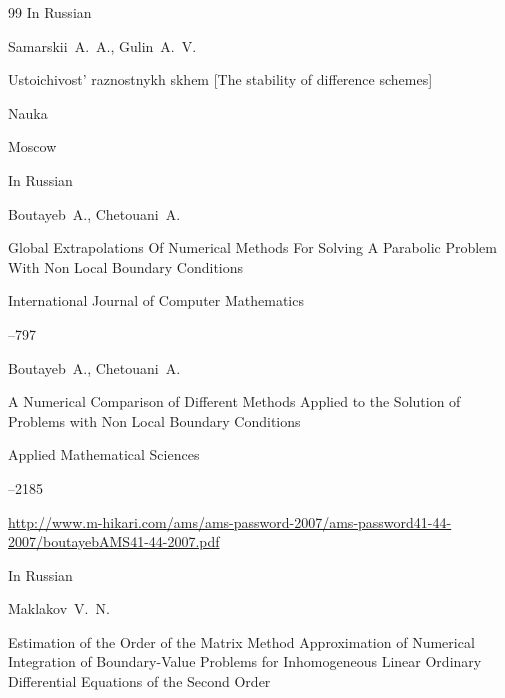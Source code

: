 \begin{thebibliography}{99}
\lang In Russian





\by Samarskii~A.~A., Gulin~A.~V.

\book Ustoichivost' raznostnykh skhem \rm [The stability of difference schemes]

\publ Nauka

\publaddr Moscow


\lang In Russian







\by Boutayeb~A., Chetouani~A.

\paper Global Extrapolations Of Numerical Methods For Solving A Parabolic Problem With Non Local Boundary Conditions

\jour International Journal of Computer Mathematics



--797






\by Boutayeb~A., Chetouani~A.

\paper A Numerical Comparison of Different Methods Applied to the Solution of Problems with Non Local Boundary Conditions

\jour Applied Mathematical Sciences




--2185

\elink \url{http://www.m-hikari.com/ams/ams-password-2007/ams-password41-44-2007/boutayebAMS41-44-2007.pdf}






\lang In Russian

\by Maklakov~V.~N.

\paper Estimation of the Order of the Matrix Method Approximation of Numerical Integration of Boundary-Value Problems for Inhomogeneous Linear Ordinary Differential Equations of the Second Order


\end{thebibliography}
